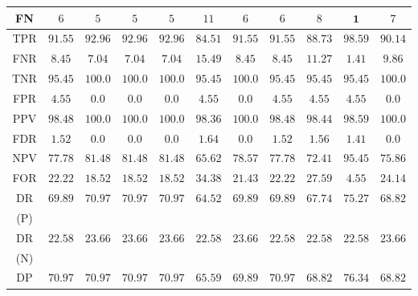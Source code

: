 \let\LaTeXcline\cline\documentclass[sn-mathphys-num]{sn-jnl}\let\cline\LaTeXcline
\begin{document}
\begin{table}[!ht]
\begin{tabular}{|c|c|c|c|c|c|c|c|c|c|c|}
        FN & $6$ & $5$ & $5$ & $5$ & $11$ & $6$ & $6$ & $8$ & $\mathbf{1}$ & $7$ \\ \hline
        TPR & $91.55$ & $92.96$ & $92.96$ & $92.96$ & $84.51$ & $91.55$ & $91.55$ & $88.73$ & $\mathbf{98.59}$ & $90.14$ \\ \hline
        FNR & $8.45$ & $7.04$ & $7.04$ & $7.04$ & $15.49$ & $8.45$ & $8.45$ & $11.27$ & $\mathbf{1.41}$ & $9.86$ \\ \hline
        TNR & $95.45$ & $\mathbf{100.0}$ & $\mathbf{100.0}$ & $\mathbf{100.0}$ & $95.45$ & $\mathbf{100.0}$ & $95.45$ & $95.45$ & $95.45$ & $\mathbf{100.0}$ \\ \hline
        FPR & $4.55$ & $\mathbf{0.0}$ & $\mathbf{0.0}$ & $\mathbf{0.0}$ & $4.55$ & $\mathbf{0.0}$ & $4.55$ & $4.55$ & $4.55$ & $\mathbf{0.0}$ \\ \hline
        PPV & $98.48$ & $\mathbf{100.0}$ & $\mathbf{100.0}$ & $\mathbf{100.0}$ & $98.36$ & $\mathbf{100.0}$ & $98.48$ & $98.44$ & $98.59$ & $\mathbf{100.0}$ \\ \hline
        FDR & $1.52$ & $\mathbf{0.0}$ & $\mathbf{0.0}$ & $\mathbf{0.0}$ & $1.64$ & $\mathbf{0.0}$ & $1.52$ & $1.56$ & $1.41$ & $\mathbf{0.0}$ \\ \hline
        NPV & $77.78$ & $81.48$ & $81.48$ & $81.48$ & $65.62$ & $78.57$ & $77.78$ & $72.41$ & $\mathbf{95.45}$ & $75.86$ \\ \hline
        FOR & $22.22$ & $18.52$ & $18.52$ & $18.52$ & $34.38$ & $21.43$ & $22.22$ & $27.59$ & $\mathbf{4.55}$ & $24.14$ \\ \hline
        DR & \multirow{2}{*}{$69.89$} & \multirow{2}{*}{$70.97$} & \multirow{2}{*}{$70.97$} & \multirow{2}{*}{$70.97$} & \multirow{2}{*}{$64.52$} & \multirow{2}{*}{$69.89$} & \multirow{2}{*}{$69.89$} & \multirow{2}{*}{$67.74$} & \multirow{2}{*}{$\mathbf{75.27}$} & \multirow{2}{*}{$68.82$} \\
        (P) & & & & & & & & & & \\ \hline
        DR & \multirow{2}{*}{$22.58$} & \multirow{2}{*}{$\mathbf{23.66}$} & \multirow{2}{*}{$\mathbf{23.66}$} & \multirow{2}{*}{$\mathbf{23.66}$} & \multirow{2}{*}{$22.58$} & \multirow{2}{*}{$\mathbf{23.66}$} & \multirow{2}{*}{$22.58$} & \multirow{2}{*}{$22.58$} & \multirow{2}{*}{$22.58$} & \multirow{2}{*}{$\mathbf{23.66}$} \\
        (N) & & & & & & & & & & \\ \hline
        DP & \multirow{2}{*}{$70.97$} & \multirow{2}{*}{$70.97$} & \multirow{2}{*}{$70.97$} & \multirow{2}{*}{$70.97$} & \multirow{2}{*}{$65.59$} & \multirow{2}{*}{$69.89$} & \multirow{2}{*}{$70.97$} & \multirow{2}{*}{$68.82$} & \multirow{2}{*}{$\mathbf{76.34}$} & \multirow{2}{*}{$68.82$} \\

\end{tabular}
\end{table}
\end{document}
